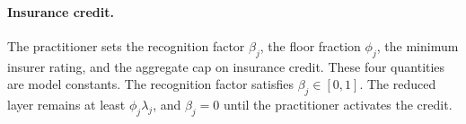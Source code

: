 \paragraph{Insurance credit.}
The practitioner sets the recognition factor $\beta_j$, the floor fraction $\phi_j$, the minimum insurer rating, and the aggregate cap on insurance credit. These four quantities are model constants. The recognition factor satisfies $\beta_j\in[0,1]$. The reduced layer remains at least $\phi_j\lambda_j$, and $\beta_j=0$ until the practitioner activates the credit.
